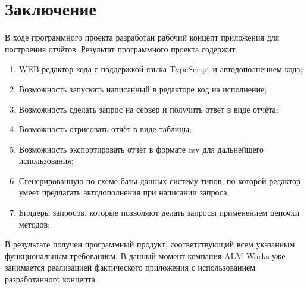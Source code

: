\documentclass[12pt]{article}
\begin{document}
    \section{Заключение}
    В ходе программного проекта разработан рабочий концепт приложения для построения отчётов. Результат программного проекта содержит
    \begin{enumerate}
        \item WEB-редактор кода с поддержкой языка TypeScript и автодополнением кода;
        \item Возможность запускать написанный в редакторе код на исполнение;
        \item Возможность сделать запрос на сервер и получить ответ в виде отчёта;
        \item Возможность отрисовать отчёт в виде таблицы;
        \item Возможность экспортировать отчёт в формате csv для дальнейшего использования;
        \item Сгенерированную по схеме базы данных систему типов, по которой редактор умеет предлагать автодополнения при написании запроса;
        \item Билдеры запросов, которые позволяют делать запросы применением цепочки методов;
    \end{enumerate}
    В результате получен программный продукт, соответствующий всем указанным функциональным требованиям. В данный момент компания ALM Works уже
    занимается реализацией фактического приложения с использованием разработанного концепта.
\end{document}
